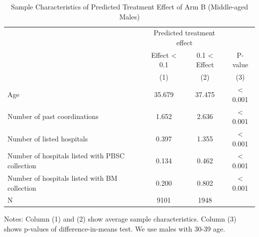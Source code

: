 \documentclass[
]{article}
\begin{document}
\begin{table}[H]

\caption{\label{tab:rcf-middle-male}Sample Characteristics of Predicted Treatment Effect of Arm B (Middle-aged Males)}
\centering
\fontsize{9}{11}\selectfont
\fontsize{9}{11}\selectfont
\begin{threeparttable}
\begin{tabular}[t]{lccc}
\toprule
\multicolumn{1}{c}{ } & \multicolumn{2}{c}{Predicted treatment effect} & \multicolumn{1}{c}{ } \\
\cmidrule(l{3pt}r{3pt}){2-3}
\multicolumn{1}{c}{ } & \multicolumn{1}{c}{Effect < 0.1} & \multicolumn{1}{c}{0.1 < Effect} & \multicolumn{1}{c}{P-value} \\
\cmidrule(l{3pt}r{3pt}){2-2} \cmidrule(l{3pt}r{3pt}){3-3} \cmidrule(l{3pt}r{3pt}){4-4}
 & (1) & (2) & (3)\\
\midrule
Age & 35.679 & 37.475 & < 0.001\\
Number of past coordinations & 1.652 & 2.636 & < 0.001\\
Number of listed hospitals & 0.397 & 1.355 & < 0.001\\
Number of hospitals listed with PBSC collection & 0.134 & 0.462 & < 0.001\\
Number of hospitals listed with BM collection & 0.200 & 0.802 & < 0.001\\
N & 9101 & 1948 & \\
\bottomrule
\end{tabular}
\begin{tablenotes}
\item Notes: Column (1) and (2) show average sample characteristics. Column (3) shows p-values of difference-in-means test. We use males with 30-39 age.
\end{tablenotes}
\end{threeparttable}
\end{table}
\end{document}
